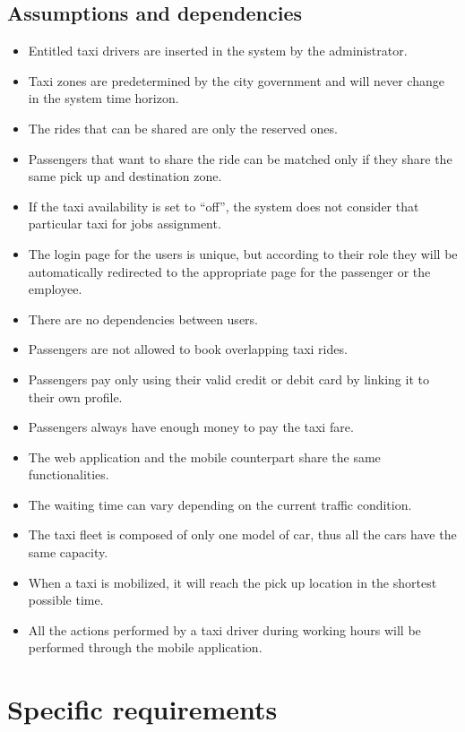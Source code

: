 \documentclass[a4paper,11pt]{report} %
\begin{document}
	\subsection{Assumptions and dependencies}
		\begin{itemize}
			\item Entitled taxi drivers are inserted in the system by the administrator.
			\item Taxi zones are predetermined by the city government and will never change in the system time horizon.
			\item The rides that can be shared are only the reserved ones.
			\item Passengers that want to share the ride can be matched only if they share the same pick up and destination zone.
			\item If the taxi availability is set to ``off'', the system does not consider that particular taxi for jobs assignment.
			\item The login page for the users is unique, but according to their role they will be automatically redirected to the appropriate page for the passenger or the employee.
			\item There are no dependencies between users.
			\item Passengers are not allowed to book overlapping taxi rides.
			\item Passengers pay only using their valid credit or debit card by linking it to their own profile.
			\item Passengers always have enough money to pay the taxi fare.
			\item The web application and the mobile counterpart share the same functionalities.
			\item The waiting time can vary depending on the current traffic condition.
			\item The taxi fleet is composed of only one model of car, thus all the cars have the same capacity.
			\item When a taxi is mobilized, it will reach the pick up location in the shortest possible time.
			\item All the actions performed by a taxi driver during working hours will be performed through the mobile application.
		\end{itemize}
	
	
	\section{Specific requirements}
	
\end{document}

